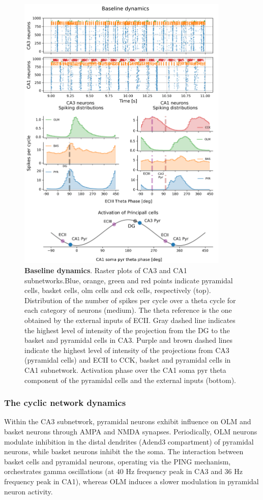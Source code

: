 \documentclass[../main.tex]{subfiles}
\begin{document}
\begin{figure}
    \centering
    \includegraphics[width=0.9\textwidth]{chapter4/figures/baseline_dynamics-test.png}
    \caption{ \textbf{Baseline dynamics}. Raster plots of CA3 and CA1 subnetworks.Blue, orange, green and red points indicate pyramidal cells, basket cells, olm cells and cck cells, respectively (top).
    Distribution of the number of spikes per cycle over a theta cycle for each category of neurons (medium).
    The theta reference is the one obtained by the external inputs of ECII.
    Gray dashed line indicates the highest level of intensity of the projection from the DG to the basket and pyramidal cells in CA3.
    Purple and brown dashed lines indicate the highest level of intensity of the projections from CA3 (pyramidal cells) and ECII to CCK, basket and pyramidal cells in CA1 subnetwork.
    Activation phase over the CA1 soma pyr theta component of the pyramidal cells and the external inputs (bottom).}
    \label{fig:baseline-dynamics}
\end{figure}
\subsubsection{The cyclic network dynamics}
Within the CA3 subnetwork, pyramidal neurons exhibit influence on OLM and basket neurons through AMPA and NMDA synapses.
Periodically, OLM neurons modulate inhibition in the distal dendrites (Adend3 compartment) of pyramidal neurons, while basket neurons inhibit the the soma.
The interaction between basket cells and pyramidal neurons, operating via the PING mechanism, orchestrates gamma oscillations (at 40 Hz frequency peak in CA3 and 36 Hz frequency peak in CA1), whereas OLM induces a slower modulation in pyramidal neuron activity.
\end{document}
